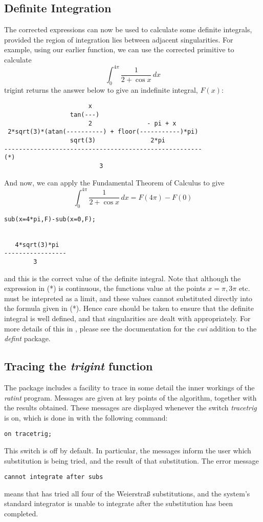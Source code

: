\subsection{Definite Integration}
The corrected expressions can now be used to calculate some definite integrals, provided the region of integration lies between adjacent singularities. For example, using our earlier function, we can use the corrected primitive to calculate
     \begin{equation} \int_{0}^{4\pi} \frac{1}{2+\cos x}\,dx \end{equation}
trigint returns the answer below to give an indefinite integral, $F(x)$:
\begin{verbatim}
                       x
                  tan(---)
                       2               - pi + x
 2*sqrt(3)*(atan(----------) + floor(-----------)*pi)
                  sqrt(3)               2*pi
------------------------------------------------------                   (*)
                          3
\end{verbatim}
And now, we can apply the Fundamental Theorem of Calculus to give
 \begin{equation} \int_{0}^{4\pi} \frac{1}{2+\cos x}\,dx = F(4\pi)-F(0) \end{equation}
\begin{verbatim}
sub(x=4*pi,F)-sub(x=0,F);


   4*sqrt(3)*pi
-----------------
        3
\end{verbatim}
and this is the correct value of the definite integral.
Note that although the expression in (*) is continuous, the functions value at the points $x=\pi,3\pi$ etc. must be intepreted as a limit, and these values cannot substituted directly into the formula given in (*). Hence care should be taken to ensure that the definite integral is well defined, and that singularities are dealt with appropriately. For more details of this in \REDUCE, please see the documentation for the \emph{cwi} addition to the \emph{defint} package.

\subsection{Tracing the \emph{trigint} function}

The package includes a facility to trace in some detail the inner workings of the \emph{ratint} program. Messages are given at key points of the algorithm, together with the results obtained. These messages are displayed whenever the switch \emph{tracetrig} is on, which is done in \REDUCE with the following command:
\begin{verbatim}
on tracetrig;
\end{verbatim}
This switch is off by default. In particular, the messages inform the user which substitution is being tried, and the result of that substitution. The error message
\begin{verbatim}
cannot integrate after subs
\end{verbatim}
means that \REDUCE has tried all four of the Weierstra\ss \hspace{1 mm} substitutions, and the system's standard integrator is unable to integrate after the substitution has been completed.


